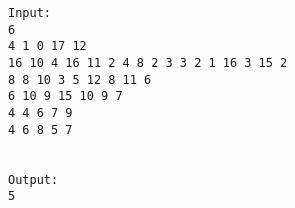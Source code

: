 \begin{verbatim}
Input:
6
4 1 0 17 12
16 10 4 16 11 2 4 8 2 3 3 2 1 16 3 15 2
8 8 10 3 5 12 8 11 6
6 10 9 15 10 9 7
4 4 6 7 9
4 6 8 5 7


Output:
5
\end{verbatim}